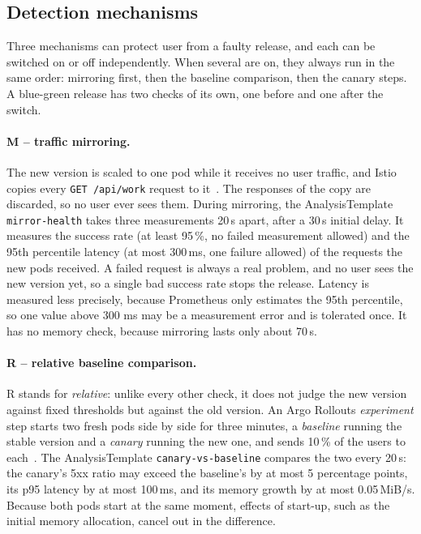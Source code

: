 \subsection{Detection mechanisms}
\label{sec:EvalMechanisms}
Three mechanisms can protect user from a faulty release, and each can be switched on or off independently. When several are on, they always run in the same order: mirroring first, then the baseline comparison, then the canary steps. A blue-green release has two checks of its own, one before and one after the switch.

\paragraph{M -- traffic mirroring.} The new version is scaled to one pod while it receives no user traffic, and Istio copies every \texttt{GET /api/work} request to it~\cite{IstioVirtualService}. The responses of the copy are discarded, so no user ever sees them. During mirroring, the AnalysisTemplate \texttt{mirror-health} takes three measurements 20\,s apart, after a 30\,s initial delay. It measures the success rate (at least 95\,\%, no failed measurement allowed) and the 95th percentile latency (at most 300\,ms, one failure allowed) of the requests the new pods received. A failed request is always a real problem, and no user sees the new version yet, so a single bad success rate stops the release. Latency is measured less precisely, because Prometheus only estimates the 95th percentile, so one value above 300 ms may be a measurement error and is tolerated once. It has no memory check, because mirroring lasts only about 70\,s.

\paragraph{R -- relative baseline comparison.} R stands for \emph{relative}: unlike every other check, it does not judge the new version against fixed thresholds but against the old version. An Argo Rollouts \emph{experiment} step starts two fresh pods side by side for three minutes, a \emph{baseline} running the stable version and a \emph{canary} running the new one, and sends 10\,\% of the users to each~\cite{ArgoRolloutsExperiment}. The AnalysisTemplate \texttt{canary-vs-baseline} compares the two every 20\,s: the canary's 5xx ratio may exceed the baseline's by at most 5 percentage points, its p95 latency by at most 100\,ms, and its memory growth by at most 0.05\,MiB/s. Because both pods start at the same moment, effects of start-up, such as the initial memory allocation, cancel out in the difference.

